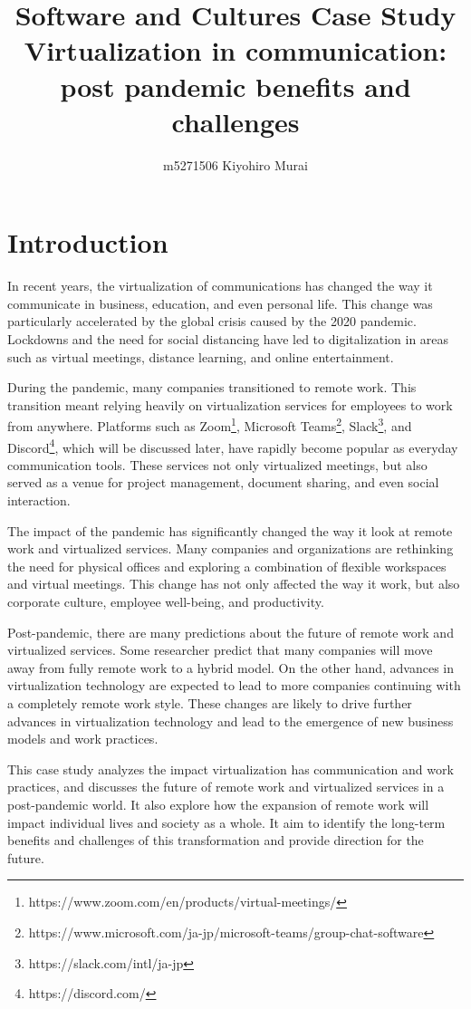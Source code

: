 \documentclass[12pt]{article}
\title{Software and Cultures Case Study \\ \large Virtualization in
    communication: post pandemic benefits and challenges}
\author{m5271506 Kiyohiro Murai}
\date{}
\begin{document}
\maketitle
\tableofcontents
\newpage

\section{Introduction}
In recent years, the virtualization of communications has changed the way it
communicate in business, education, and even personal life. This change was
particularly accelerated by the global crisis caused by the 2020 pandemic.
Lockdowns and the need for social distancing have led to digitalization in
areas such as virtual meetings, distance learning, and online entertainment.

During the pandemic, many companies transitioned to remote work. This
transition meant relying heavily on virtualization services for employees to
work from anywhere. Platforms such as
Zoom\footnote{https://www.zoom.com/en/products/virtual-meetings/}, Microsoft
Teams\footnote{https://www.microsoft.com/ja-jp/microsoft-teams/group-chat-software},
Slack\footnote{https://slack.com/intl/ja-jp}, and
Discord\footnote{https://discord.com/}, which will be discussed later, have
rapidly become popular
as everyday
communication tools\cite{zoom_status, teams_status, slack_status,
    discord_status}. These services not only virtualized meetings, but also
served as a venue for project management, document sharing, and even social
interaction.

The impact of the pandemic has significantly changed the way it look at remote
work and virtualized services. Many companies and organizations are rethinking
the need for physical offices and exploring a combination of flexible
workspaces and virtual meetings. This change has not only affected the
way it work, but also corporate culture, employee well-being, and productivity.

Post-pandemic, there are many predictions about the future of remote work and
virtualized services. Some researcher predict that many companies will move
away from fully remote work to a hybrid model. On the other hand, advances in
virtualization technology are expected to lead to more companies continuing
with a completely remote work style. These changes are likely to drive further
advances in virtualization technology and lead to the emergence of new business
models and work practices.

This case study analyzes the impact virtualization has communication and work
practices, and discusses the future of remote work and virtualized services in
a post-pandemic world. It also explore how the expansion of remote work will
impact individual lives and society as a whole. It aim to identify the
long-term benefits and challenges of this transformation and provide direction
for the future.
\end{document}
